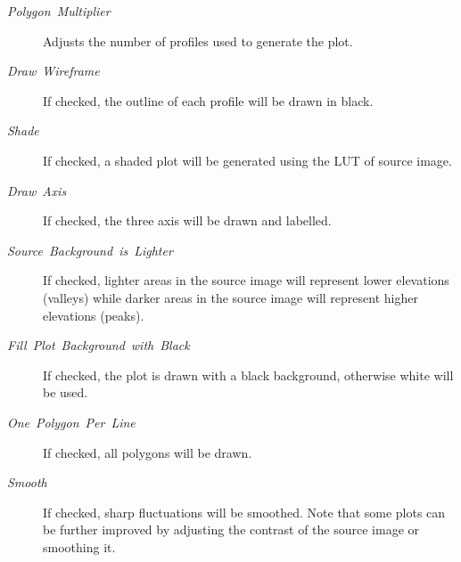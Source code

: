 \begin{description}
\item [{\emph{Polygon\ Multiplier}}] Adjusts the number of profiles used
to generate the plot. 
\item [{\emph{Draw}\ \emph{Wireframe}}] If checked, the outline of each
profile will be drawn in black. 
\item [{\emph{Shade}}] If checked, a shaded plot will be generated using
the LUT of source image.
\item [{\emph{Draw}\ \emph{Axis}}] If checked, the three axis will be
drawn and labelled. 
\item [{\emph{Source}\ \emph{Background}\ \emph{is}\ \emph{Lighter}}] If
checked, lighter areas in the source image will represent lower elevations
(valleys) while darker areas in the source image will represent higher
elevations (peaks). 
\item [{\emph{Fill}\ \emph{Plot}\ \emph{Background}\ \emph{with}\ \emph{Black}}] If
checked, the plot is drawn with a black background, otherwise white
will be used.
\item [{\emph{One}\ \emph{Polygon}\ \emph{Per}\ \emph{Line}}] If checked,
all polygons will be drawn.
\item [{\emph{Smooth}}] If checked, sharp fluctuations will be smoothed.
Note that some plots can be further improved by adjusting the contrast
of the source image or smoothing it. 
\end{description}



\subsection[\protect\userinterface{Gels\lyxarrow{}}]{\protect{}\label{sub:Gels}\improvement{}}

